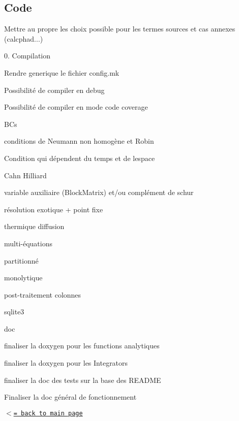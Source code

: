 \subsection*{Code}

Mettre au propre les choix possible pour les termes sources et cas annexes (calcphad...)

0. Compilation
\begin{DoxyEnumerate}
\item Rendre generique le fichier config.\+mk
\item Possibilité de compiler en debug
\item Possibilité de compiler en mode code coverage
\end{DoxyEnumerate}

B\+Cs
\begin{DoxyEnumerate}
\item conditions de Neumann non homogène et Robin
\item Condition qui dépendent du temps et de l\textquotesingle{}espace
\end{DoxyEnumerate}

Cahn Hilliard
\begin{DoxyEnumerate}
\item variable auxiliaire (Block\+Matrix) et/ou complément de schur
\item résolution exotique + point fixe
\end{DoxyEnumerate}

thermique diffusion


\begin{DoxyEnumerate}
\item multi-\/équations
\begin{DoxyEnumerate}
\item partitionné
\item monolytique
\end{DoxyEnumerate}
\item post-\/traitement colonnes
\begin{DoxyEnumerate}
\item sqlite3
\end{DoxyEnumerate}
\item doc
\begin{DoxyEnumerate}
\item finaliser la doxygen pour les functions analytiques
\item finaliser la doxygen pour les Integrators
\item finaliser la doc des tests sur la base des R\+E\+A\+D\+ME
\item Finaliser la doc général de fonctionnement
\end{DoxyEnumerate}
\end{DoxyEnumerate}

\href{index.html}{\tt $<$= back to main page} 